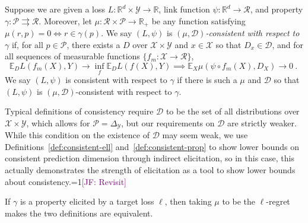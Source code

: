 \documentclass[anon,12pt]{colt2021} %
\newcommand{\Comments}{1}
\newcommand{\mynote}[2]{\ifnum\Comments=1\textcolor{#1}{#2}\fi}
\newcommand{\jessie}[1]{\mynote{purple}{[JF: #1]}}
\newcommand{\reals}{\mathbb{R}}
\newcommand{\simplex}{\Delta_\Y}
\newcommand{\propdis}{\mu}
\newcommand{\D}{\mathcal{D}}
\newcommand{\E}{\mathbb{E}}
\newcommand{\R}{\mathcal{R}}
\renewcommand{\P}{\mathcal{P}}
\newcommand{\X}{\mathcal{X}}
\newcommand{\Y}{\mathcal{Y}}
\newcommand{\toto}{\rightrightarrows}
\begin{document}
\begin{definition}\label{def:consistent-prop}
	Suppose we are given a loss $L : \reals^d \times \Y \to \reals$, link function $\psi: \reals^d \to \R$, and property $\gamma:\P \toto \R$.
	Moreover, let $\propdis : \R \times \P \to \reals_+$ be any function satisfying $\propdis(r,p) = 0 \iff r \in \gamma(p)$.
	We say $(L, \psi)$ is \emph{$(\propdis, \D)$-consistent with respect to} $\gamma$ if, for all $p \in \P$, there exists a $D$ over $\X \times\Y$ and $x \in \X$ so that $D_x \in \D$, and for all sequences of measurable functions $\{f_m: \X \to \R\}$, 
	\begin{equation}
    \E_{D} L(f_m(X), Y) \to \inf_f \E_{D} L( f(X), Y) \implies \E_X \propdis(\psi \circ f_m(X), D_X) \to 0~.~
  \end{equation}
	We say $(L,\psi)$ is consistent with respect to $\gamma$ if there is such a $\propdis$ and $\D$ so that $(L,\psi)$ is $(\propdis, \D)$-consistent with respect to $\gamma$.
\end{definition}

Typical definitions of consistency require $\D$ to be the set of all distributions over $\X \times \Y$, which allows for $\P = \simplex$, but our requirements on $\D$ are strictly weaker.
While this condition on the existence of $\D$ may seem weak, we use Definitions~\ref{def:consistent-ell} and~\ref{def:consistent-prop} to show lower bounds on consistent prediction dimension through indirect elicitation, so in this case, this actually demonstrates the strength of elicitation as a tool to show lower bounds about consistency.\jessie{Revisit}



If $\gamma$ is a property elicited by a target loss $\ell$, then taking $\propdis$ to be the $\ell$-regret makes the two definitions are equivalent. %
\end{document}
